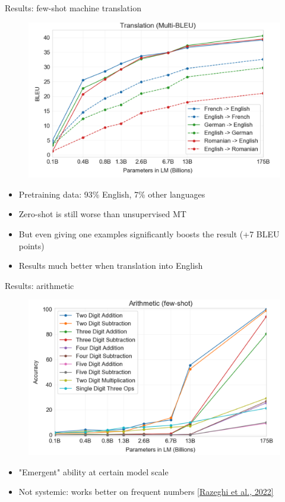 \documentclass[usenames,dvipsnames,notes,11pt,aspectratio=169,hyperref={colorlinks=true, linkcolor=blue}]{beamer}
\begin{document}
\begin{frame}
    {Results: few-shot machine translation}
    \begin{figure}
        \includegraphics[height=0.6\textheight]{figures/gpt3-translation}
    \end{figure}
    \begin{itemize}
        \item Pretraining data: 93\% English, 7\% other languages
        \item Zero-shot is still worse than unsupervised MT
        \item But even giving one examples significantly boosts the result (+7 BLEU points)
        \item Results much better when translation into English
    \end{itemize}
\end{frame}

\begin{frame}
    {Results: arithmetic}
    \begin{figure}
        \includegraphics[height=0.6\textheight]{figures/gpt3-arith}
    \end{figure}
    \begin{itemize}
        \item "Emergent" ability at certain model scale
        \item Not systemic: works better on frequent numbers \href{https://arxiv.org/abs/2202.07206}{[Razeghi et al., 2022]}
    \end{itemize}
\end{frame}
\end{document}
